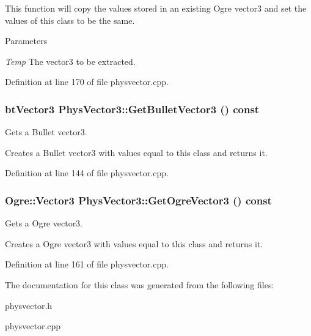 This function will copy the values stored in an existing Ogre vector3 and set the values of this class to be the same. 
\begin{DoxyParams}{Parameters}
\item[{\em Temp}]The vector3 to be extracted. \end{DoxyParams}


Definition at line 170 of file physvector.cpp.

\hypertarget{classPhysVector3_a7109b1bf54cae678e5cada4e82482918}{
\subsubsection[{GetBulletVector3}]{\setlength{\rightskip}{0pt plus 5cm}btVector3 PhysVector3::GetBulletVector3 () const}}
\label{da/d11/classPhysVector3_a7109b1bf54cae678e5cada4e82482918}


Gets a Bullet vector3. 

Creates a Bullet vector3 with values equal to this class and returns it. 

Definition at line 144 of file physvector.cpp.

\hypertarget{classPhysVector3_a11bb925270d1fa86620e1ad080c507db}{
\subsubsection[{GetOgreVector3}]{\setlength{\rightskip}{0pt plus 5cm}Ogre::Vector3 PhysVector3::GetOgreVector3 () const}}
\label{da/d11/classPhysVector3_a11bb925270d1fa86620e1ad080c507db}


Gets a Ogre vector3. 

Creates a Ogre vector3 with values equal to this class and returns it. 

Definition at line 161 of file physvector.cpp.



The documentation for this class was generated from the following files:\begin{DoxyCompactItemize}
\item 
physvector.h\item 
physvector.cpp\end{DoxyCompactItemize}
